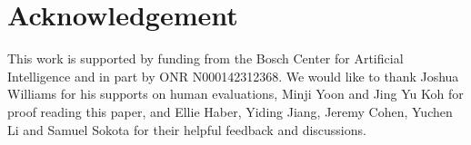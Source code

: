 \section{Acknowledgement}

This work is supported by funding from the Bosch Center for Artificial Intelligence and in part by ONR N000142312368. We would like to thank Joshua Williams for his supports on human evaluations, Minji Yoon and Jing Yu Koh for proof reading this paper, and Ellie Haber, Yiding Jiang, Jeremy Cohen, Yuchen Li and Samuel Sokota for their helpful feedback and discussions.